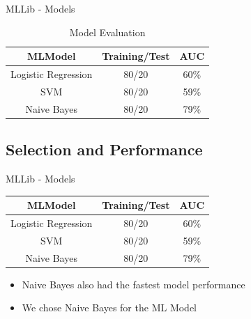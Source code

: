 \documentclass{beamer}
\begin{document}
\begin{frame}{MLLib - Models}

\begin{table}[]
\begin{tabular}{|c|c|c|}
\hline
\textbf{MLModel}    & \textbf{Training/Test} & \textbf{AUC} \\ \hline
Logistic Regression & 80/20                  & 60\%         \\ \hline
SVM                 & 80/20                  & 59\%         \\ \hline
Naive Bayes         & 80/20                  & 79\%         \\ \hline
\end{tabular}
\caption{Model Evaluation}
\label{tab:my-table}
\end{table}


\end{frame}


\subsection{Selection and Performance}

\begin{frame}{MLLib - Models}

\begin{table}[]
\begin{tabular}{|c|c|c|}
\hline
\textbf{MLModel}    & \textbf{Training/Test} & \textbf{AUC} \\ \hline
Logistic Regression & 80/20                  & 60\%         \\ \hline
SVM                 & 80/20                  & 59\%         \\ \hline
Naive Bayes         & 80/20                  & 79\%         \\ \hline
\end{tabular}
\end{table}

\begin{itemize}
\item Naive Bayes also had the fastest model performance 
\item We chose Naive Bayes for the ML Model
\end{itemize}

\end{frame}
\end{document}
